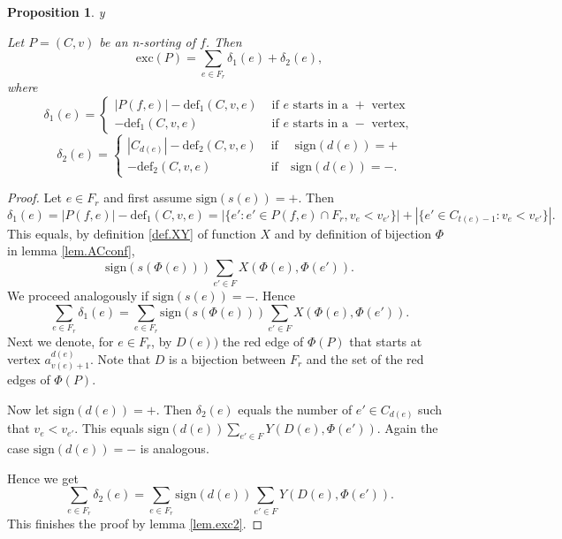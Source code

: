\documentclass{amsart}
\theoremstyle{plain}
\newtheorem{proposition}{Proposition}[section]
\theoremstyle{definition}
\theoremstyle{remark}
\def\printname#1{
        \if\draft y
                \smash{\makebox[0pt]{\hspace{-0.5in}
                        \raisebox{8pt}{\tt\tiny #1}}}
        \fi
}
\def\lbl#1{\label{#1}\printname{#1}}
\def\d{\delta}
\def\sign{\mathrm{sign}}
\def\exc{\mathrm{exc}}
\def\defect{\mathrm{def}}
\begin{document}
\begin{proposition}
\lbl{prop.gk2}
Let $P= (C,v)$ be an n-sorting of $f$. Then
$$
\exc(P)=\sum_{e\in F_r}\d_1(e)+\d_2(e),
$$
where 
$$
\d_1(e)=\begin{cases}
|P(f,e)|-\defect_1(C,v,e) & \text{ if $e$ starts in a $+$ vertex}
\\
-\defect_1(C,v,e) & \text{ if $e$ starts in a $-$ vertex},
\end{cases}
$$
$$
\d_2(e)= 
\begin{cases}
|C_{d(e)}|- \defect_2(C,v,e) &\text{ if } \quad \sign(d(e))=+ \\
- \defect_2(C,v,e) & \text{ if} \quad \sign(d(e))=-.
\end{cases}
$$
\end{proposition}
\begin{proof}
Let $e\in F_r$ and first assume $\sign(s(e))= +$. Then 
$$
\d_1(e)= |P(f,e)|- \defect_1(C,v,e)= 
|\{e': e'\in P(f,e)\cap F_r, v_{e}< v_{e'} \}|+ 
|\{e' \in C_{t(e)-1}: v_{e}< v_{e'} \}|.
$$
This equals, by definition \ref{def.XY} of function $X$ and by definition of 
bijection $\Phi$ in 
lemma \ref{lem.ACconf},  
$$
\sign(s(\Phi(e)))\sum_{e'\in F}X(\Phi(e), \Phi(e')).
$$
We proceed analogously if $\sign(s(e))= -$. Hence
$$
\sum_{e\in F_r}\d_1(e)= \sum_{e\in F_r}\sign(s(\Phi(e)))
\sum_{e'\in F}X(\Phi(e), \Phi(e')).
$$
Next we denote, for $e\in F_r$, by $D(e))$ the red edge of $\Phi(P)$ that 
starts at vertex
$a^{d(e)}_{v(e)+1}$.
Note that $D$ is a bijection between $F_r$ and the set of the red edges of 
$\Phi(P)$. 

Now let $\sign(d(e))=+$. Then $\d_2(e)$ equals the number of $e'\in C_{d(e)}$ 
such that
$v_e< v_{e'}$. This equals $\sign(d(e))\sum_{e'\in F}Y(D(e), \Phi(e'))$.
Again the case $\sign(d(e))= -$ is analogous.

Hence we get 
$$
\sum_{e\in F_r}\d_2(e)= \sum_{e\in F_r}\sign(d(e))\sum_{e'\in F}Y(D(e), 
\Phi(e')).
$$
This finishes the proof by lemma \ref{lem.exc2}.

\end{proof}
\end{document}
